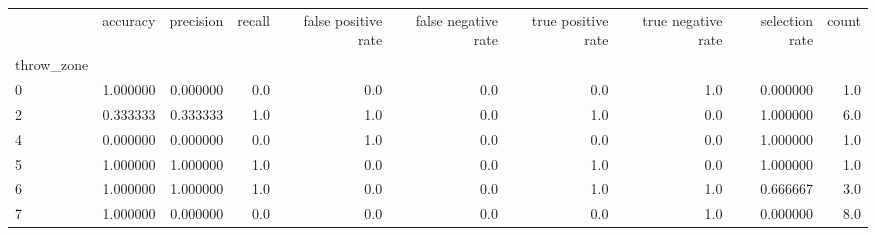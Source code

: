 \begin{tabular}{lrrrrrrrrr}
\toprule
{} &  accuracy &  precision &  recall &  false positive rate &  false negative rate &  true positive rate &  true negative rate &  selection rate &  count \\
throw\_zone &           &            &         &                      &                      &                     &                     &                 &        \\
\midrule
0          &  1.000000 &   0.000000 &     0.0 &                  0.0 &                  0.0 &                 0.0 &                 1.0 &        0.000000 &    1.0 \\
2          &  0.333333 &   0.333333 &     1.0 &                  1.0 &                  0.0 &                 1.0 &                 0.0 &        1.000000 &    6.0 \\
4          &  0.000000 &   0.000000 &     0.0 &                  1.0 &                  0.0 &                 0.0 &                 0.0 &        1.000000 &    1.0 \\
5          &  1.000000 &   1.000000 &     1.0 &                  0.0 &                  0.0 &                 1.0 &                 0.0 &        1.000000 &    1.0 \\
6          &  1.000000 &   1.000000 &     1.0 &                  0.0 &                  0.0 &                 1.0 &                 1.0 &        0.666667 &    3.0 \\
7          &  1.000000 &   0.000000 &     0.0 &                  0.0 &                  0.0 &                 0.0 &                 1.0 &        0.000000 &    8.0 \\
\bottomrule
\end{tabular}
